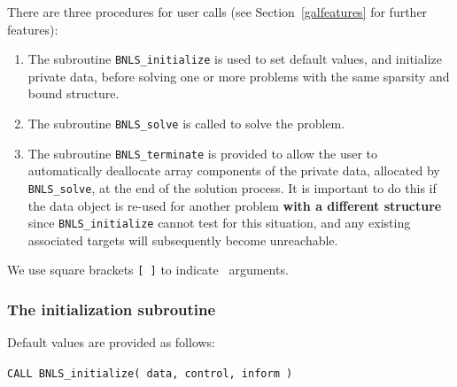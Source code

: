\documentclass{galahad}
\newcommand{\packagename}{BNLS}
\begin{document}
\galarguments
There are three procedures for user calls
(see Section~\ref{galfeatures} for further features):

\begin{enumerate}
\item The subroutine
      {\tt \packagename\_initialize}
      is used to set default values, and initialize private data,
      before solving one or more problems with the
      same sparsity and bound structure.
\item The subroutine
      {\tt \packagename\_solve}
      is called to solve the problem.
\item The subroutine
      {\tt \packagename\_terminate}
      is provided to allow the user to automatically deallocate array
       components of the private data, allocated by
       {\tt \packagename\_solve},
       at the end of the solution process.
       It is important to do this if the data object is re-used for another
       problem {\bf with a different structure}
       since {\tt \packagename\_initialize} cannot test for this situation,
       and any existing associated targets will subsequently become unreachable.
\end{enumerate}
We use square brackets {\tt [ ]} to indicate \optional\ arguments.


\subsubsection{The initialization subroutine}\label{subinit}
 Default values are provided as follows:
\vspace*{1mm}

\hspace{8mm}
{\tt CALL \packagename\_initialize( data, control, inform )}
\end{document}
